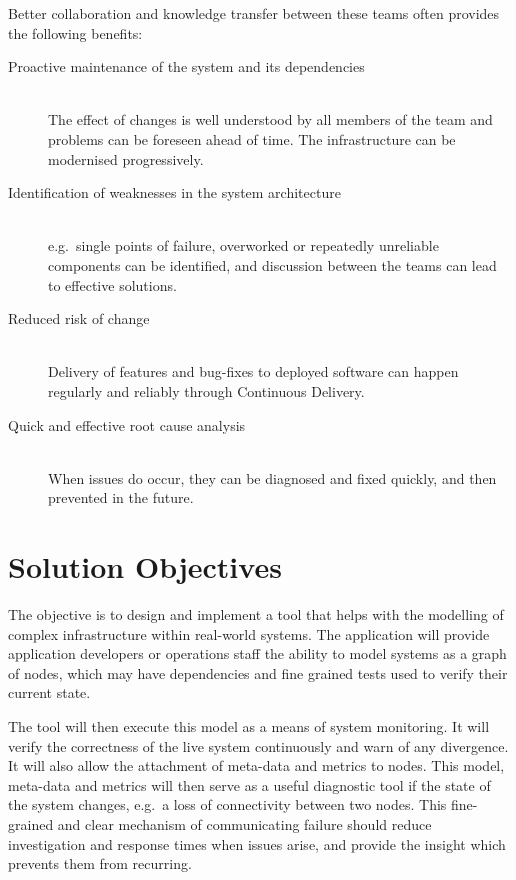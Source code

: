 \documentclass{cshonours}
\begin{document}
Better collaboration and knowledge transfer between these teams often provides the following benefits:

\begin{description}
  \item [Proactive maintenance of the system and its dependencies]\hfill \\
    The effect of changes is well understood by all members of the team and problems can be foreseen ahead of time. The infrastructure can be modernised progressively.
  \item [Identification of weaknesses in the system architecture]\hfill \\
    e.g.\ single points of failure, overworked or repeatedly unreliable components can be identified, and discussion between the teams can lead to effective solutions. 
  \item [Reduced risk of change]\hfill \\
    Delivery of features and bug-fixes to deployed software can happen regularly and reliably through Continuous Delivery. 
  \item [Quick and effective root cause analysis]\hfill \\
    When issues do occur, they can be diagnosed and fixed quickly, and then prevented in the future.
\end{description}

\section{Solution Objectives}

The objective is to design and implement a tool that helps with the modelling of complex infrastructure within real-world systems. The application will provide application developers or operations staff the ability to model systems as a graph of nodes, which may have dependencies and fine grained tests used to verify their current state.

The tool will then execute this model as a means of system monitoring. It will verify the correctness of the live system continuously and warn of any divergence. It will also allow the attachment of meta-data and metrics to nodes. This model, meta-data and metrics will then serve as a useful diagnostic tool if the state of the system changes, e.g.\ a loss of connectivity between two nodes. This fine-grained and clear mechanism of communicating failure should reduce investigation and response times when issues arise, and provide the insight which prevents them from recurring.
\end{document}
